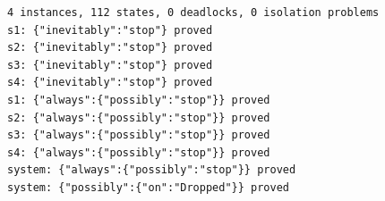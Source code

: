 \begin{lstlisting}[language={},basicstyle=\ttfamily\scriptsize,breaklines=true]
4 instances, 112 states, 0 deadlocks, 0 isolation problems
s1: {"inevitably":"stop"} proved
s2: {"inevitably":"stop"} proved
s3: {"inevitably":"stop"} proved
s4: {"inevitably":"stop"} proved
s1: {"always":{"possibly":"stop"}} proved
s2: {"always":{"possibly":"stop"}} proved
s3: {"always":{"possibly":"stop"}} proved
s4: {"always":{"possibly":"stop"}} proved
system: {"always":{"possibly":"stop"}} proved
system: {"possibly":{"on":"Dropped"}} proved
\end{lstlisting}
